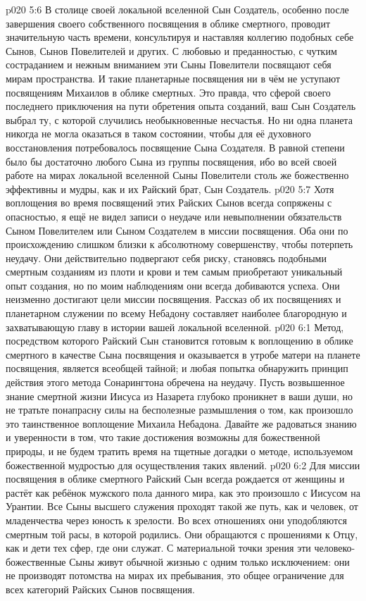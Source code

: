 \vs p020 5:6 В столице своей локальной вселенной Сын Создатель, особенно после завершения своего собственного посвящения в облике смертного, проводит значительную часть времени, консультируя и наставляя коллегию подобных себе Сынов, Сынов Повелителей и других. С любовью и преданностью, с чутким состраданием и нежным вниманием эти Сыны Повелители посвящают себя мирам пространства. И такие планетарные посвящения ни в чём не уступают посвящениям Михаилов в облике смертных. Это правда, что сферой своего последнего приключения на пути обретения опыта созданий, ваш Сын Создатель выбрал ту, с которой случились необыкновенные несчастья. Но ни одна планета никогда не могла оказаться в таком состоянии, чтобы для её духовного восстановления потребовалось посвящение Сына Создателя. В равной степени было бы достаточно любого Сына из группы посвящения, ибо во всей своей работе на мирах локальной вселенной Сыны Повелители столь же божественно эффективны и мудры, как и их Райский брат, Сын Создатель.
\vs p020 5:7 \pc Хотя воплощения во время посвящений этих Райских Сынов всегда сопряжены с опасностью, я ещё не видел записи о неудаче или невыполнении обязательств Сыном Повелителем или Сыном Создателем в миссии посвящения. Оба они по происхождению слишком близки к абсолютному совершенству, чтобы потерпеть неудачу. Они действительно подвергают себя риску, становясь подобными смертным созданиям из плоти и крови и тем самым приобретают уникальный опыт создания, но по моим наблюдениям они всегда добиваются успеха. Они неизменно достигают цели миссии посвящения. Рассказ об их посвящениях и планетарном служении по всему Небадону составляет наиболее благородную и захватывающую главу в истории вашей локальной вселенной.
\vs p020 6:1 Метод, посредством которого Райский Сын становится готовым к воплощению в облике смертного в качестве Сына посвящения и оказывается в утробе матери на планете посвящения, является всеобщей тайной; и любая попытка обнаружить принцип действия этого метода Сонарингтона обречена на неудачу. Пусть возвышенное знание смертной жизни Иисуса из Назарета глубоко проникнет в ваши души, но не тратьте понапрасну силы на бесполезные размышления о том, как произошло это таинственное воплощение Михаила Небадона. Давайте же радоваться знанию и уверенности в том, что такие достижения возможны для божественной природы, и не будем тратить время на тщетные догадки о методе, используемом божественной мудростью для осуществления таких явлений.
\vs p020 6:2 \pc Для миссии посвящения в облике смертного Райский Сын всегда рождается от женщины и растёт как ребёнок мужского пола данного мира, как это произошло с Иисусом на Урантии. Все Сыны высшего служения проходят такой же путь, как и человек, от младенчества через юность к зрелости. Во всех отношениях они уподобляются смертным той расы, в которой родились. Они обращаются с прошениями к Отцу, как и дети тех сфер, где они служат. С материальной точки зрения эти человеко\hyp{}божественные Сыны живут обычной жизнью с одним только исключением: они не производят потомства на мирах их пребывания, это общее ограничение для всех категорий Райских Сынов посвящения.
